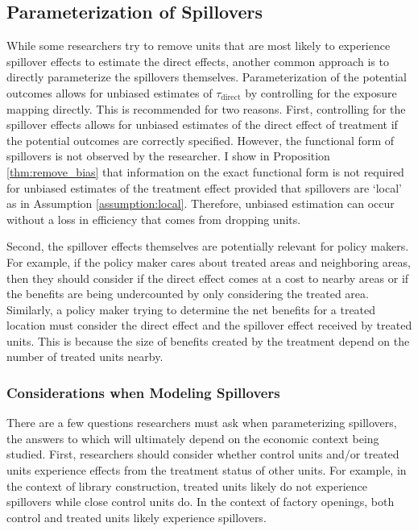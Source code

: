 \documentclass[11pt]{article}
\begin{document}
\subsection{Parameterization of Spillovers}
\label{sec:parameterize}

While some researchers try to remove units that are most likely to experience spillover effects to estimate the direct effects, another common approach is to directly parameterize the spillovers themselves. Parameterization of the potential outcomes allows for unbiased estimates of $\tau_{\text{direct}}$ by controlling for the exposure mapping directly. This is recommended for two reasons. First, controlling for the spillover effects allows for unbiased estimates of the direct effect of treatment if the potential outcomes are correctly specified. However, the functional form of spillovers is not observed by the researcher. I show in Proposition \ref{thm:remove_bias} that information on the exact functional form is not required for unbiased estimates of the treatment effect provided that spillovers are `local' as in Assumption \ref{assumption:local}. Therefore, unbiased estimation can occur without a loss in efficiency that comes from dropping units.

Second, the spillover effects themselves are potentially relevant for policy makers. For example, if the policy maker cares about treated areas and neighboring areas, then they should consider if the direct effect comes at a cost to nearby areas or if the benefits are being undercounted by only considering the treated area. Similarly, a policy maker trying to determine the net benefits for a treated location must consider the direct effect and the spillover effect received by treated units. This is because the size of benefits created by the treatment depend on the number of treated units nearby.

\subsubsection{Considerations when Modeling Spillovers} 

There are a few questions researchers must ask when parameterizing spillovers, the answers to which will ultimately depend on the economic context being studied. First, researchers should consider whether control units and/or treated units experience effects from the treatment status of other units. For example, in the context of library construction, treated units likely do not experience spillovers while close control units do. In the context of factory openings, both control and treated units likely experience spillovers. 
\end{document}
